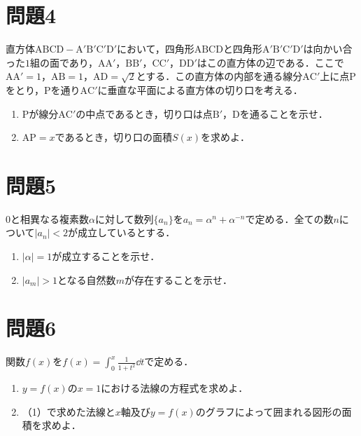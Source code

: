 \documentclass[unicode,12pt, A4j]{ltjsarticle}%
\begin{document}
\section{問題4}
直方体$\mathrm{ABCD}-\mathrm{A'B'C'D'}$において，四角形$\mathrm{ABCD}$と四角形$\mathrm{A'B'C'D'}$は向かい合った$1$組の面であり，$\mathrm{AA'}$，$\mathrm{BB'}$，$\mathrm{CC'}$，$\mathrm{DD'}$はこの直方体の辺である．ここで$\mathrm{AA'}=1$，$\mathrm{AB}=1$，$\mathrm{AD}=\sqrt{2}$とする．この直方体の内部を通る線分$\mathrm{AC'}$上に点$\mathrm{P}$をとり，$\mathrm{P}$を通り$\mathrm{AC'}$に垂直な平面による直方体の切り口を考える．
\begin{enumerate}
 \item $\mathrm{P}$が線分$\mathrm{AC'}$の中点であるとき，切り口は点$\mathrm{B'}$，$\mathrm{D}$を通ることを示せ．
 \item $\mathrm{AP}=x$であるとき，切り口の面積$S(x)$を求めよ．
\end{enumerate}

\section{問題5}
$0$と相異なる複素数$\alpha$に対して数列$\{a_n\}$を$a_n=\alpha^n+\alpha^{-n}$で定める．全ての数$n$について$|a_n|<2$が成立しているとする．
\begin{enumerate}
 \item $|\alpha|=1$が成立することを示せ．
 \item $|a_m|>1$となる自然数$m$が存在することを示せ．
\end{enumerate}

\section{問題6}
関数$f(x)$を${\displaystyle f(x)=\int_0^x\frac{1}{1+t^2}\dd t}$で定める．
\begin{enumerate}
 \item $y=f(x)$の$x=1$における法線の方程式を求めよ．
 \item （1）で求めた法線と$x$軸及び$y=f(x)$のグラフによって囲まれる図形の面積を求めよ．
\end{enumerate}
\end{document}
